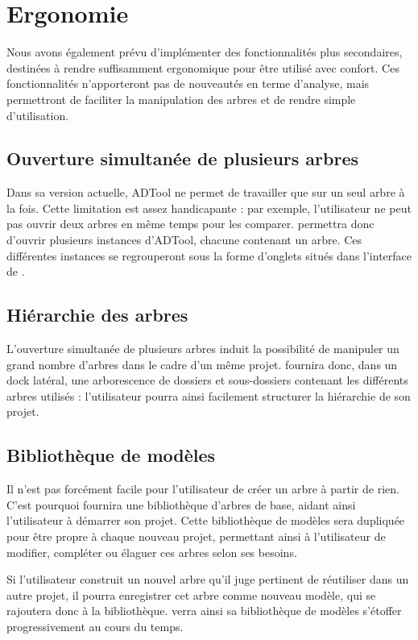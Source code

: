 \section{Ergonomie}


	Nous avons également prévu d'implémenter des fonctionnalités plus secondaires, destinées à rendre \glasir{} suffisamment ergonomique pour être utilisé avec confort. Ces fonctionnalités n'apporteront pas de nouveautés en terme d'analyse, mais permettront de faciliter la manipulation des arbres et de rendre \glasir{} simple d'utilisation.	


	\subsection{Ouverture simultanée de plusieurs arbres}
		Dans sa version actuelle, ADTool ne permet de travailler que sur un seul arbre à la fois. Cette limitation est assez  handicapante : par exemple, l'utilisateur ne peut pas ouvrir deux arbres en même temps pour les comparer. \glasir{}  permettra donc d'ouvrir plusieurs instances d'ADTool, chacune contenant un arbre. Ces différentes instances se regrouperont sous la forme d'onglets situés dans l'interface de \glasir{}.
	
	\subsection{Hiérarchie des arbres}
		L'ouverture simultanée de plusieurs arbres induit la possibilité de manipuler un grand nombre d'arbres dans le cadre d'un même projet. \glasir{} fournira donc, dans un dock latéral, une arborescence de dossiers et sous-dossiers contenant les différents arbres utilisés : l'utilisateur pourra ainsi facilement structurer la hiérarchie de son projet.
	
	\subsection{Bibliothèque de modèles}
		Il n'est pas forcément facile pour l'utilisateur de créer un arbre à partir de rien. C'est pourquoi \glasir{} fournira une bibliothèque d'arbres de base, aidant ainsi l'utilisateur à démarrer son projet. Cette bibliothèque de modèles sera dupliquée pour être propre à chaque nouveau projet, permettant ainsi à l'utilisateur de modifier, compléter ou élaguer ces arbres selon ses besoins.
		
		Si l'utilisateur construit un nouvel arbre qu'il juge pertinent de réutiliser dans un autre projet, il pourra enregistrer cet arbre comme nouveau modèle, qui se rajoutera donc à la bibliothèque. \glasir{} verra ainsi sa bibliothèque de modèles s'étoffer progressivement au cours du temps.

